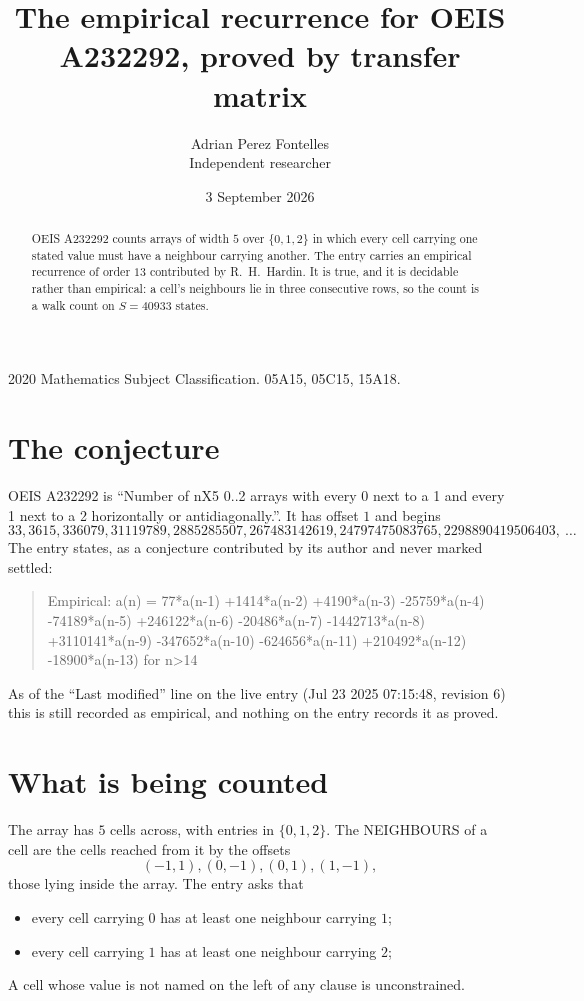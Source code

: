 \documentclass[11pt,a4paper]{article}
\title{The empirical recurrence for OEIS A232292, proved by transfer matrix}
\author{Adrian Perez Fontelles\\ \small Independent researcher}
\date{3 September 2026}
\theoremstyle{plain}
\theoremstyle{definition}
\begin{document}
\maketitle

\begin{abstract}
OEIS A232292 counts arrays of width $5$ over $\{0,1,2\}$ in which every cell carrying one stated
value must have a neighbour carrying another. The entry carries an empirical recurrence of
order $13$ contributed by R.~H.~Hardin. It is true, and it is decidable rather than
empirical: a cell's neighbours lie in three consecutive rows, so the count is a walk count on
$S=40933$ states.
\end{abstract}

\noindent\small 2020 Mathematics Subject Classification. 05A15, 05C15, 15A18.\normalsize

\section{The conjecture}

OEIS A232292 is ``Number of nX5 0..2 arrays with every 0 next to a 1 and every 1 next to a 2 horizontally or antidiagonally.''. It has offset $1$ and begins
\[
33, 3615, 336079, 31119789, 2885285507, 267483142619, 24797475083765, 2298890419506403,\ \dots
\]
The entry states, as a conjecture contributed by its author and never marked settled:
\begin{quote}
Empirical: a(n) = 77*a(n-1) +1414*a(n-2) +4190*a(n-3) -25759*a(n-4) -74189*a(n-5) +246122*a(n-6) -20486*a(n-7) -1442713*a(n-8) +3110141*a(n-9) -347652*a(n-10) -624656*a(n-11) +210492*a(n-12) -18900*a(n-13) for n>14
\end{quote}
As of the ``Last modified'' line on the live entry (Jul 23 2025 07:15:48, revision 6) this is still
recorded as empirical, and nothing on the entry records it as proved.

\section{What is being counted}

The array has $5$ cells across, with entries in $\{0,1,2\}$. The NEIGHBOURS of a cell are the
cells reached from it by the offsets
\[
(-1,1), (0,-1), (0,1), (1,-1),
\]
those lying inside the array. The entry asks that
\begin{itemize}
\item every cell carrying $0$ has at least one neighbour carrying $1$;
\item every cell carrying $1$ has at least one neighbour carrying $2$;

\end{itemize}
A cell whose value is not named on the left of any clause is unconstrained.
\end{document}
